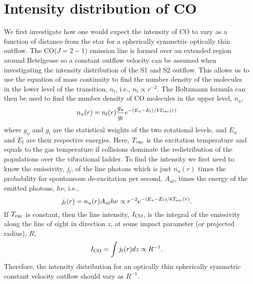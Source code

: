 \section{Intensity distribution of CO}\label{sec:5.7}
We first investigate how one would expect the intensity of CO to vary as a function of distance from the star for a spherically symmetric optically thin outflow. The CO($J=2-1$) emission line is formed over an extended region around Betelgeuse so a constant outflow velocity can be assumed when investigating the intensity distribution of the S1 and S2 outflow. This allows us to use the equation of mass continuity to find the number density of the molecules in the lower level of the transition, $n_{l}$, i.e., $n_{l} \propto r^{-2}$. The Boltzmann formula can then be used to find the number density of CO molecules in the upper level, $n_{u}$, 
\begin{equation}
n_{u}(r)=n_{l}(r)\frac{g_{u}}{g_{l}}e^{-(E_u-E_l)/kT_{\rm{exc}}(r)}
\end{equation}
where $g_{u}$ and $g_{l}$ are the statistical weights of the two rotational levels, and $E_u$ and $E_{l}$ are their respective energies. Here, $T_{\rm{exc}}$ is the excitation temperature and equals to the gas temperature if collisions dominate the redistribution of the populations over the vibrational ladder. To find the intensity we first need to know the emissivity, $j_{l}$, of the line photons which is just $n_{u}(r)$ times the probability for spontaneous de-excitation per second, $A_{ul}$, times the energy of the emitted photons, $h\nu$, i.e.,
\begin{equation}
j_{l}(r)   =  n_{u}(r)A_{ul}h\nu \propto r^{-2}e^{-(E_u-E_l)/kT_{\rm{exc}}(r)}.
\end{equation}
If $T_{\rm{exc}}$ is constant, then the line intensity, $I_{\rm{CO}}$, is the integral of the emissivity along the line of sight in direction $z$, at some impact parameter (or projected radius), $R$,
\begin{equation}
I_{\rm{CO}} = \int j_{l}(r) dz \propto R^{-1}.
\end{equation}
Therefore, the intensity distribution for an optically thin spherically symmetric constant velocity outflow should vary as $R^{-1}$.

